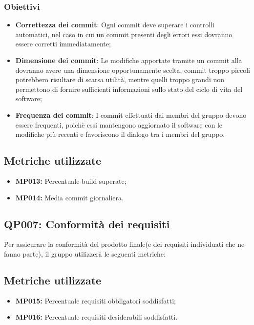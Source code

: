 \subsubsection{Obiettivi}
\begin{itemize}
	\item \textbf{Correttezza dei commit}: Ogni commit deve superare i controlli automatici, nel caso in cui un commit presenti degli errori  essi dovranno essere corretti immediatamente;
	\item \textbf{Dimensione dei commit}: Le modifiche apportate tramite un commit alla  dovranno avere una dimensione opportunamente scelta, commit troppo piccoli potrebbero risultare di scarsa utilità, mentre quelli troppo grandi non permettono di fornire sufficienti informazioni sullo stato del ciclo di vita del software;
	\item  \textbf{Frequenza dei commit}: I commit effettuati dai membri del gruppo devono essere frequenti, poichè essi mantengono aggiornato il software con le modifiche più recenti e favoriscono il dialogo tra i membri del gruppo.
	
\end{itemize}
\subsection{Metriche utilizzate}
\begin{itemize}
	\item \textbf{MP013:} Percentuale build superate;
	\item \textbf{MP014:} Media commit giornaliera.
\end{itemize}

\subsection{QP007: Conformità dei requisiti}
Per assicurare la conformità del prodotto finale(e dei requisiti individuati che ne fanno parte), il gruppo utilizzerà le seguenti metriche:

\subsection{Metriche utilizzate}
\begin{itemize}
	\item \textbf{MP015:} Percentuale requisiti obbligatori soddisfatti;
	\item \textbf{MP016:} Percentuale requisiti desiderabili soddisfatti.
\end{itemize}

